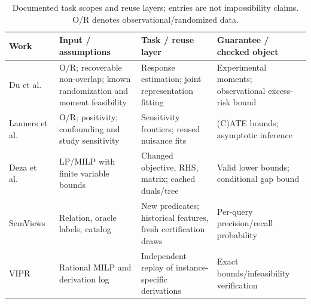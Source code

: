 \begin{table}[t]
\centering
\caption{Documented task scopes and reuse layers; entries are not impossibility claims. O/R denotes observational/randomized data.}
\label{tab:capability-comparison}
\footnotesize
\setlength{\tabcolsep}{3pt}
\renewcommand{\arraystretch}{1.12}
\begin{tabular}{@{}>{\raggedright\arraybackslash}p{}>{\raggedright\arraybackslash}p{}>{\raggedright\arraybackslash}p{}>{\raggedright\arraybackslash}p{}@{}}
\toprule
Work & Input / assumptions & Task / reuse layer & Guarantee / checked object \\
\midrule
Du et al.~\cite{du2026feasible} & O/R; recoverable non-overlap; known randomization and moment feasibility & Response estimation; joint representation fitting & Experimental moments; observational excess-risk bound \\
Lanners et al.~\cite{lanners2025fusion} & O/R; positivity; confounding and study sensitivity & Sensitivity frontiers; reused nuisance fits & (C)ATE bounds; asymptotic inference \\
Deza et al.~\cite{Deza2026MIPSensitivity} & LP/MILP with finite variable bounds & Changed objective, RHS, matrix; cached duals/tree & Valid lower bounds; conditional gap bound \\
SemViews~\cite{Hassanzadeh2026SemanticViews} & Relation, oracle labels, catalog & New predicates; historical features, fresh certification draws & Per-query precision/recall probability \\
VIPR~\cite{Cheung2017VIPR} & Rational MILP and derivation log & Independent replay of instance-specific derivations & Exact bounds/infeasibility verification \\
\bottomrule
\end{tabular}
\end{table}

